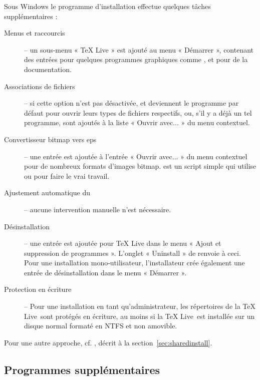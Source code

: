 \documentclass[german, english, french]{article}
\renewcommand{\TL}{\TeX{} Live\xspace}%
\begin{document}
Sous Windows le programme d'installation effectue quelques tâches
supplémentaires :
\begin{description}
\item[Menus et raccourcis] -- un sous-menu « \TL{} » est ajouté au menu
  « Démarrer », contenant des entrées pour quelques programmes graphiques comme
  ,  et pour de la documentation.
\item[Associations de fichiers] -- si cette option n'est pas désactivée,
   et  deviennent le programme par défaut pour
  ouvrir leurs types de fichiers respectifs, ou, s'il y a déjà un tel programme,
  sont ajoutés à la liste « Ouvrir avec... » du menu contextuel.
\item[Convertisseur bitmap vers eps] -- une entrée  est
  ajoutée à l'entrée « Ouvrir avec... » du menu contextuel pour de nombreux
  formats d'images bitmap.  est un script simple qui utilise
   ou  pour faire le vrai travail.
\item[Ajustement automatique du ] -- aucune intervention manuelle
  n'est nécessaire.
\item[Désinstallation] -- une entrée est ajoutée pour \TL{} dans le menu « Ajout
  et suppression de programmes ». L'onglet « Uninstall » de  renvoie
  à ceci. Pour une installation mono-utilisateur, l'installateur crée également
  une entrée de désinstallation dans le menu « Démarrer ».
\item[Protection en écriture] -- Pour une installation en tant
  qu'administrateur, les répertoires de la \TL\ sont protégés en écriture, au
  moins si la \TL\ est installée sur un disque normal formaté en NTFS et non
  amovible.
\end{description}

Pour une autre approche, cf. , décrit à la
section~\ref{sec:sharedinstall}.

\subsection{Programmes supplémentaires}
\end{document}
